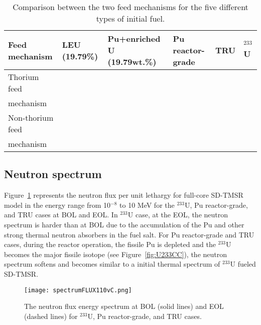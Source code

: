 \begin{table}  [!h]
	\begin{minipage}{\linewidth}
		\renewcommand\footnoterule{}
		\renewcommand{\thefootnote}{\alph{footnote}}
		\caption{Comparison between the two feed mechanisms for the five different 
			types of initial fuel.}
		\label{tab:comp_feeds}
		\vspace{0.1in}
		\begin{tabularx}{\textwidth}{p{} X p{} 
				p{} X X 
			}  %
			\hline
			Feed mechanism & \gls{LEU} (19.79\%) & Pu+enriched U (19.79wt.\%) & Pu 
			reactor-grade & \gls{TRU}& $^{233}$U \\
			\hline
			Thorium feed\\ mechanism&\xmark&\xmark&\xmark&\xmark& \cmark \\
			Non-thorium feed\\ mechanism &\xmark&\xmark&\cmark\footnotemark[1] 
			&\cmark\footnotemark[2] & \xmark\footnotemark[3] \\
			\hline
		\end{tabularx}
		\vspace{-1.5ex}%
	\end{minipage}
\end{table}
\FloatBarrier

\subsection{Neutron spectrum}
Figure~\ref{fig:spectrumFLUX110vC} represents the neutron flux per unit 
lethargy for full-core SD-TMSR model in the energy range from 10$^{-8}$ to 10 
MeV for the $^{233}$U, Pu reactor-grade, and TRU cases at BOL and EOL. In $^{233}$U 
case, at the EOL, the neutron spectrum is harder than at BOL due to the 
accumulation of the Pu and other strong thermal neutron absorbers in the fuel 
salt. For Pu reactor-grade and TRU cases, during the reactor operation, the 
fissile Pu is depleted and the $^{233}$U becomes the major fissile isotope 
(see Figure~\ref{fig:U233CC}), the neutron spectrum softens and becomes 
similar to a initial thermal spectrum of $^{233}$U fueled \gls{SD-TMSR}.
 \begin{figure}
 	\centering
 	\texttt{[image: spectrumFLUX110vC.png]}
 			\vspace{-0.4in}
 	\caption{The neutron flux energy spectrum at BOL (solid lines) and EOL (dashed lines) for $^{233}$U, Pu reactor-grade, and TRU cases.}
 	\label{fig:spectrumFLUX110vC}
\end{figure}


